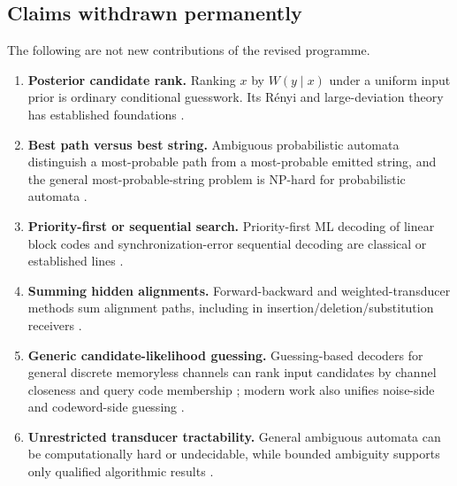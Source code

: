 \documentclass[11pt]{article}
\theoremstyle{definition}
\theoremstyle{remark}
\begin{document}
\subsection{Claims withdrawn permanently}
The following are not new contributions of the revised programme.
\begin{enumerate}[leftmargin=2em]
\item \textbf{Posterior candidate rank.}  Ranking $x$ by $W(y\mid x)$ under a uniform input prior is ordinary conditional guesswork.  Its R\'enyi and large-deviation theory has established foundations \cite{Arikan1996,Li2018}.
\item \textbf{Best path versus best string.}  Ambiguous probabilistic automata distinguish a most-probable path from a most-probable emitted string, and the general most-probable-string problem is NP-hard for probabilistic automata \cite{HigueraOncina2014}.
\item \textbf{Priority-first or sequential search.}  Priority-first ML decoding of linear block codes and synchronization-error sequential decoding are classical or established lines \cite{Gallager1961,Han1993,Banerjee2022}.
\item \textbf{Summing hidden alignments.}  Forward-backward and weighted-transducer methods sum alignment paths, including in insertion/deletion/substitution receivers \cite{DaveyMacKay2001,Mohri2009}.
\item \textbf{Generic candidate-likelihood guessing.}  Guessing-based decoders for general discrete memoryless channels can rank input candidates by channel closeness and query code membership \cite{TanJoudeh2025}; modern work also unifies noise-side and codeword-side guessing \cite{Wang2025}.
\item \textbf{Unrestricted transducer tractability.}  General ambiguous automata can be computationally hard or undecidable, while bounded ambiguity supports only qualified algorithmic results \cite{HigueraOncina2014,Fijalkow2022}.
\end{enumerate}
\end{document}
